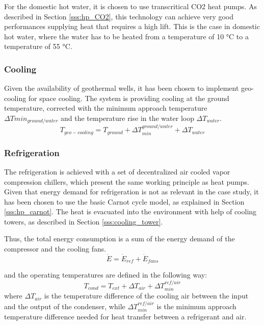 \documentclass{article}
\begin{document}
For the domestic hot water, it is chosen to use transcritical CO2 heat pumps. As described in Section \ref{sss:hp_CO2}, this technology can achieve very good performances supplying heat that requires a high lift. This is the case in domestic hot water, where the water has to be heated from a temperature of 10 \si{\celsius} to a temperature of 55 \si{\celsius}.

\subsubsection{Cooling}
Given the availability of geothermal wells, it has been chosen to implement geo-cooling for space cooling. The system is providing cooling at the ground temperature, corrected with the minimum approach temperature $\Delta Tmin_{ground/water}$ and the temperature rise in the water loop $\Delta T_{water}$.
\begin{equation}
T_{geo-cooling} = T_{ground} + \Delta T_{min}^{ground/water} + \Delta T_{water}
\end{equation}

\subsubsection{Refrigeration}
The refrigeration is achieved with a set of decentralized air cooled vapor compression chillers, which present the same working principle as heat pumps. Given that energy demand for refrigeration is not as relevant in the case study, it has been chosen to use the basic Carnot cycle model, as explained in Section \ref{sss:hp_carnot}. The heat is evacuated into the environment with help of cooling towers, as described in Section \ref{sss:cooling_tower}.

Thus, the total energy consumption is a sum of the energy demand of the compressor and the cooling fans.
\begin{equation}
\dot{E} = \dot{E}_{ref} + \dot{E}_{fans}
\end{equation}

and the operating temperatures are defined in the following way:
\begin{equation}
    T_{cond} = T_{ext} + \Delta T_{air} + \Delta T_{min}^{ref/air}
\end{equation}
where $\Delta T_{air}$ is the temperature difference of the cooling air between the input and the output of the condenser, while $\Delta T_{min}^{ref/air}$ is the minimum approach temperature difference needed for heat transfer between a refrigerant and air.\\
\end{document}

